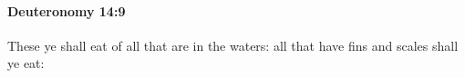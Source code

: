 
		\paragraph{Deuteronomy 14:9} %
			\label{DEUTERONOMY-14-9}

			These ye shall eat of all that are in the waters: all that have fins and scales shall ye eat:


